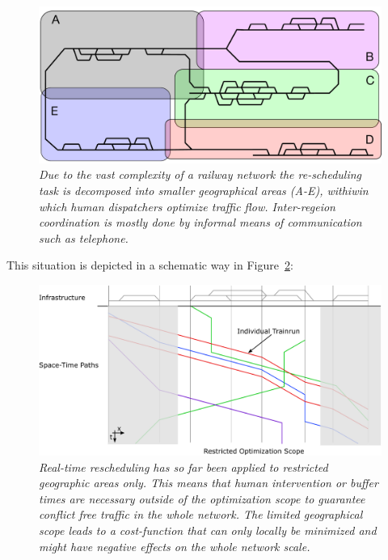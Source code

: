 \documentclass{article}
\begin{document}
%
\begin{figure}[hbtp]
	\centering
  \includegraphics[width=\textwidth]{Figures/disposition_areas.pdf}
	\caption{\textit{Due to the vast complexity of a railway network the re-scheduling task is decomposed into smaller geographical areas (A-E), withiwin which human dispatchers optimize traffic flow. Inter-regeion coordination is mostly done by informal means of communication such as telephone.} }
	\label{fig:geographical_decomposition}
\end{figure}
%

This situation is depicted in a schematic way in Figure~\ref{fig:introduction_compensation}:
%
\begin{figure}[hbtp]
	\centering
  \includegraphics[width=\textwidth]{Figures/rsp_rescheduling_heute.pdf}
	\caption{\textit{Real-time rescheduling has so far been applied to restricted geographic areas only. This means that human intervention or buffer times are necessary outside of the optimization scope to guarantee conflict free traffic in the whole network. The limited geographical scope leads to a cost-function that can only locally be minimized and might have negative effects on the whole network scale.} }
	\label{fig:introduction_compensation}
\end{figure}
%
\end{document}
